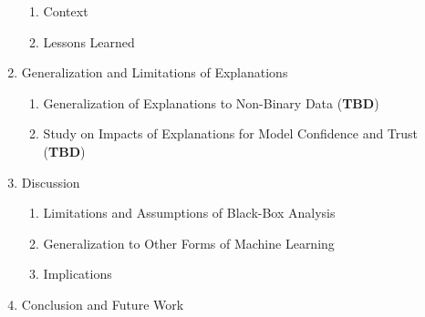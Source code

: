 \begin{enumerate}[label*=\arabic*.]
\begin{enumerate}[label*=\arabic*.]
        \item Context
        \item Lessons Learned
    \end{enumerate}
    \item Generalization and Limitations of Explanations
    \begin{enumerate}[label*=\arabic*.]
        \item Generalization of Explanations to Non-Binary Data (\textbf{TBD})
        \item Study on Impacts of Explanations for Model Confidence and Trust (\textbf{TBD})
    \end{enumerate}
    \item Discussion
    \begin{enumerate}[label*=\arabic*.]
        \item Limitations and Assumptions of Black-Box Analysis
        \item Generalization to Other Forms of Machine Learning
        \item Implications
    \end{enumerate}
    \item Conclusion and Future Work
\end{enumerate}
\newpage
